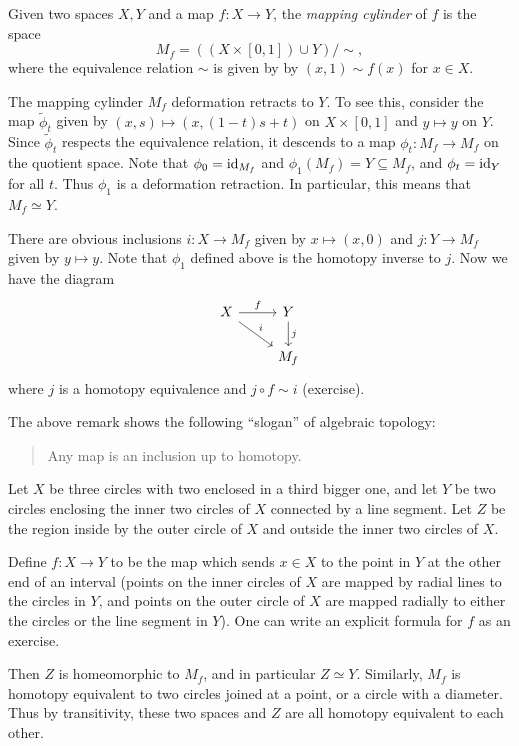 \begin{definition}
  Given two spaces $X, Y$ and a map $f : X \to Y$,
  the \emph{mapping cylinder} of $f$ is the space
  \[
    M_f = ((X \times [0, 1]) \cup Y) / {\sim},
  \]
  where the equivalence relation $\sim$ is given by
  by $(x, 1) \sim f(x)$ for $x \in X$.
\end{definition}

\begin{remark}
  The mapping cylinder $M_f$ deformation retracts to $Y$.
  To see this, consider the map $\widetilde{\phi}_t$
  given by
  $(x, s) \mapsto (x, (1 - t)s + t)$ on
  $X \times [0, 1]$ and $y \mapsto y$ on $Y$. Since
  $\widetilde{\phi}_t$ respects the equivalence
  relation, it descends to a map $\phi_t : M_f \to M_f$
  on the quotient space. Note that
  $\phi_0 = \operatorname{id}_{M_f}$ and $\phi_1(M_f) = Y \subseteq M_f$,
  and $\phi_t = \operatorname{id}_Y$ for all $t$. Thus $\phi_1$ is a
  deformation retraction. In particular,
  this means that $M_f \simeq Y$.
\end{remark}

\begin{remark}
  There are obvious inclusions
  $i : X \to M_f$ given by $x \mapsto (x, 0)$
  and $j : Y \to M_f$ given by $y \mapsto y$.
  Note that $\phi_1$ defined above is the homotopy
  inverse to $j$. Now we have the diagram
  \[
    \begin{tikzcd}
      X \ar[r, "f"] \ar[dr, "i"] & Y \ar[d, "j"] \\
      & M_f
    \end{tikzcd}
  \]
  where $j$ is a homotopy equivalence and
  $j \circ f \sim i$ (exercise).
\end{remark}

\begin{remark}
  The above remark shows the following ``slogan''
  of algebraic topology:
  \begin{quote}
    Any map is an inclusion up to homotopy.
  \end{quote}
\end{remark}

\begin{example}
  Let $X$ be three circles with two enclosed in a third
  bigger one, and let $Y$ be two circles enclosing the
  inner two circles of $X$
  connected by a line segment. Let $Z$ be the region
  inside by the outer circle of $X$ and outside
  the inner two circles of $X$.

  Define $f : X \to Y$
  to be the map which sends $x \in X$ to the point in
  $Y$ at the other end of an interval (points on the
  inner circles of $X$ are mapped by radial lines to the
  circles in $Y$, and points on the outer circle of $X$
  are mapped radially to either the circles or
  the line segment in $Y$). One can write an explicit
  formula for $f$ as an exercise.

  Then $Z$ is homeomorphic to $M_f$, and in particular
  $Z \simeq Y$. Similarly, $M_f$ is homotopy equivalent
  to two circles joined at a point, or a circle
  with a diameter. Thus by transitivity, these two spaces
  and $Z$ are all homotopy equivalent to each other.
\end{example}

